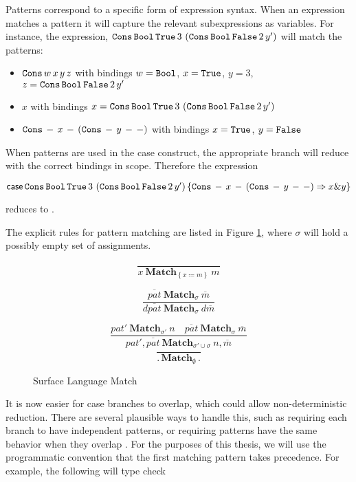 Patterns correspond to a specific form of expression syntax.
When an expression matches a pattern it will capture the relevant subexpressions as variables.
For instance, the expression,
  $\mathtt{Cons}{}\,\mathtt{Bool}{}\,\mathtt{True}{}\,3\,\left(\mathtt{Cons}{}\,\mathtt{Bool}{}\,\mathtt{False}{}\,2\,y'\right)$
  will match the patterns:
\begin{itemize}
\item $\mathtt{Cons}{}\,w\,x\,y\,z$ with bindings $w=\mathtt{Bool}{}$, $x=\mathtt{True}{}$, $y=3$, $z=\mathtt{Cons}{}\,\mathtt{Bool}{}\,\mathtt{False}{}\,2\,y'$
\item $x$ with bindings $x = \mathtt{Cons}{}\,\mathtt{Bool}{}\,\mathtt{True}{}\,3\,\left(\mathtt{Cons}{}\,\mathtt{Bool}{}\,\mathtt{False}{}\,2\,y'\right)$
\item $\mathtt{Cons}{}\,-\,x\,-\,\left(\mathtt{Cons}{}\,-\,y\,-\,-\right)$ with bindings $x = \mathtt{True}{}$, $y = \mathtt{False}{}$
\end{itemize}
When patterns are used in the case construct, the appropriate branch will reduce with the correct bindings in scope.
Therefore the expression 

$\mathsf{case}{}\,\mathtt{Cons}{}\,\mathtt{Bool}{}\,\mathtt{True}{}\,3\,\left(\mathtt{Cons}{}\,\mathtt{Bool}{}\,\mathtt{False}{}\,2\,y'\right)
 \left\{ \mathtt{Cons}{}\,-\,x\,-\,\left(\mathtt{Cons}{}\,-\,y\,-\,-\right)\Rightarrow x\&y\right\} $

reduces to \False{}.

The explicit rules for pattern matching are listed in Figure \ref{fig:surface-data-match}, where $\sigma$ will hold a possibly empty set of assignments.

\begin{figure}
\[
\frac{\,}{x\ \mathbf{Match}_{\left\{ x\coloneqq m\right\} }\ m}
\]

\[
\frac{\overline{pat}\ \mathbf{Match}_{\sigma}\ \overline{m}}{d\overline{pat}\ \mathbf{Match}_{\sigma}\ d\overline{m}}
\]

\[
\frac{pat'\ \mathbf{Match}_{\sigma'}\ n\quad\overline{pat}\ \mathbf{Match}_{\sigma}\ \overline{m}}{pat',\overline{pat}\ \mathbf{Match}_{\sigma'\cup\sigma}\ n,\overline{m}}
\]
\[
\frac{\,}{.\,\mathbf{Match}_{\emptyset}\,.}
\]

\caption{Surface Language Match}
\label{fig:surface-data-match}
\end{figure}

It is now easier for case branches to overlap, which could allow non-deterministic reduction.
There are several plausible ways to handle this, such as requiring each branch to have independent patterns, or requiring patterns have the same behavior when they overlap \cite{10.1007/978-3-642-54833-8_6}.
For the purposes of this thesis, we will use the programmatic convention that the first matching pattern takes precedence.
For example, the following will type check


